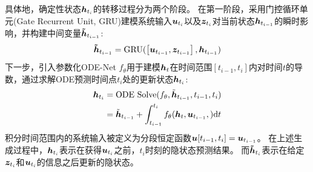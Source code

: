 具体地，确定性状态$\boldsymbol{h}_{t_i}$的转移过程分为两个阶段。
在第一阶段，采用门控循环单元(Gate Recurrent Unit, GRU)建模系统输入$\boldsymbol{u}_{t_i}$以及$\boldsymbol{z}_{t_i}$对当前状态$\boldsymbol{h}_{t_{i-1}}$的瞬时影响，并构建中间变量$\boldsymbol{\tilde{h}}_{t_{i-1}}$:
\begin{equation}
\thtm  = \text{GRU}(\left [\utm, \ztm\right], \htm)
\label{equ:gru}
\end{equation}
下一步，引入参数化ODE-Net $f_\theta$用于建模$\boldsymbol h_{t}$在时间范围$[t_{i-1},t_{i}]$内对时间$t$的导数，通过求解ODE预测时间点$t_i$处的更新状态$\boldsymbol{h}_{t_i}$:
\begin{equation}
\begin{aligned}
   \hti&=\text{ODE Solve}(f_\theta, \tilde{\b{h}}_{t_{i-1}}, t_{i-1}, t_i) \\
   &= \tilde{\b{h}}_{t_{i-1}} + \int_{t_{i-1}}^{t_i}f_\theta(\b h_t, \utm, ) \text{d}t
   \label{equ:ode}
\end{aligned}
\end{equation}
积分时间范围内的系统输入被定义为分段恒定函数$\boldsymbol u[t_{i-1},t_i]=\boldsymbol{u}_{t_{i-1}}$。
在上述生成过程中，$\boldsymbol{h}_{t_i}$表示在获得$\boldsymbol{u}_{t_i}$之前，$t_i$时刻的隐状态预测结果。
而$\boldsymbol{\tilde{h}}_{t_i}$表示在给定$\boldsymbol{z}_{t_i}$和$\boldsymbol{u}_{t_i}$的信息之后更新的隐状态。

